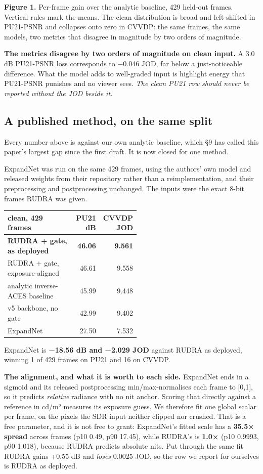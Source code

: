 \textbf{Figure 1.} Per-frame gain over the analytic baseline, 429 held-out frames.
Vertical rules mark the means. The clean distribution is broad and left-shifted
in PU21-PSNR and collapses onto zero in CVVDP: the same frames, the same models,
two metrics that disagree in magnitude by two orders of magnitude.

\textbf{The metrics disagree by two orders of magnitude on clean input.} A 3.0 dB
PU21-PSNR loss corresponds to −0.046 JOD, far below a just-noticeable
difference. What the model adds to well-graded input is highlight energy that
PU21-PSNR punishes and no viewer sees. \emph{The clean PU21 row should never be
reported without the JOD beside it.}

\hypertarget{a-published-method-on-the-same-split}{%
\subsection{A published method, on the same split}\label{a-published-method-on-the-same-split}}

Every number above is against our own analytic baseline, which §9 has called
this paper's largest gap since the first draft. It is now closed for one method.

ExpandNet \cite{marnerides2018} was run on the same 429 frames, using the authors' own model and
released weights from their repository rather than a reimplementation, and their
preprocessing and postprocessing unchanged. The inputs were the exact 8-bit
frames RUDRA was given.

\begin{longtable}[]{@{}p{0.52\linewidth}rr@{}}
\toprule
clean, 429 frames & PU21 dB & CVVDP JOD\tabularnewline
\midrule
\endhead
\textbf{RUDRA + gate, as deployed} & \textbf{46.06} & \textbf{9.561}\tabularnewline
RUDRA + gate, exposure-aligned & 46.61 & 9.558\tabularnewline
analytic inverse-ACES baseline & 45.99 & 9.448\tabularnewline
v5 backbone, no gate & 42.99 & 9.402\tabularnewline
ExpandNet & 27.50 & 7.532\tabularnewline
\bottomrule
\end{longtable}

ExpandNet is \textbf{−18.56 dB and −2.029 JOD} against RUDRA as deployed, winning 1
of 429 frames on PU21 and 16 on CVVDP.

\textbf{The alignment, and what it is worth to each side.} ExpandNet ends in a
sigmoid and its released postprocessing min/max-normalises each frame to {[}0,1{]},
so it predicts \emph{relative} radiance with no nit anchor. Scoring that directly
against a reference in cd/m² measures its exposure guess. We therefore fit one
global scalar per frame, on the pixels the SDR input neither clipped nor
crushed. That is a free parameter, and it is not free to grant: ExpandNet's
fitted scale has a \textbf{35.5× spread} across frames (p10 0.49, p90 17.45), while
RUDRA's is \textbf{1.0×} (p10 0.9993, p90 1.018), because RUDRA predicts absolute
nits. Put through the same fit RUDRA gains +0.55 dB and \emph{loses} 0.0025 JOD, so
the row we report for ourselves is RUDRA as deployed.

